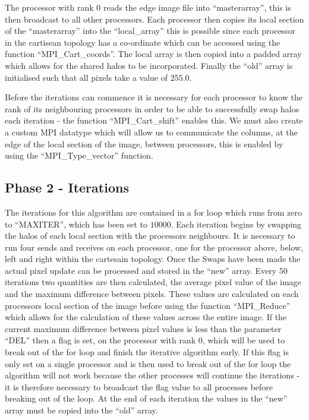 \documentclass[12pt]{article}
\begin{document}
The processor with rank 0 reads the edge image file into ``masterarray'', this is then broadcast to all other processors. Each processor then copies its local section of the ``masterarray'' into the ``local\_array''  this is possible since each processor in the cartisean topology has a co-ordinate which can be accessed using the function ``MPI\_Cart\_coords''. The local array is then copied into a padded array which allows for the shared halos to be incorporated. Finally the ``old'' array is initialised such that all pixels take a value of $255.0$.

Before the iterations can commence it is necessary for each processor to know the rank of its neighbouring processors in order to be able to successfully swap halos each iteration - the function ``MPI\_Cart\_shift'' enables this. We must also create a custom MPI datatype which will allow us to communicate the columns, at the edge of the local section of the image, between processors, this is enabled by using the ``MPI\_Type\_vector'' function.

\subsection{Phase 2 - Iterations}

The iterations for this algorithm are contained in a for loop which runs from zero to ``MAXITER'', which has been set to $10000$. Each iteration begins by swapping the halos of each local section with the processors neighbours. It is necessary to run four sends and receives on each processor, one for the processor above, below, left and right within the cartesain topology. Once the Swaps have been made the actual pixel update can be processed and stored in the ``new'' array. Every $50$ iterations two quantities are then calculated, the average pixel value of the image and the maximum difference between pixels. These values are calculated on each processors local section of the image before using the function ``MPI\_Reduce'' which allows for the calculation of these values across the entire image. If the current maximum difference between pixel values is less than the parameter ``DEL'' then a flag is set, on the processor with rank 0, which will be used to break out of the for loop and finish the iterative algorithm early. If this flag is only set on a single processor and is then used to break out of the for loop the algorithm will not work because the other processes will continue the iterations - it is therefore necessary to broadcast the flag value to all processes before breaking out of the loop. At the end of each iteration the values in the ``new'' array must be copied into the ``old'' array.
\end{document}
